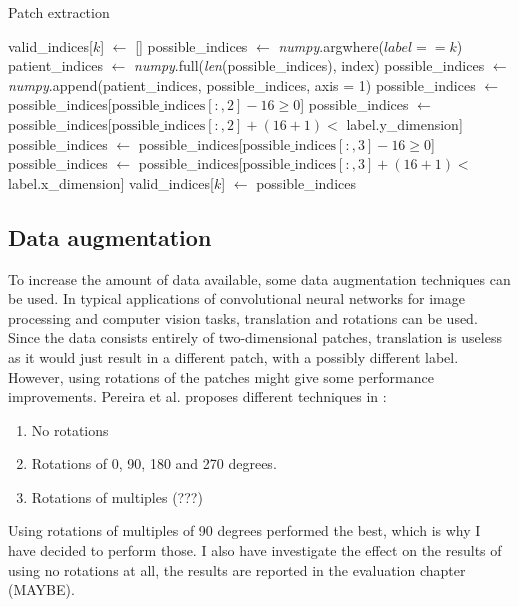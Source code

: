 \documentclass[12pt,a4paper,twoside,openright]{report}
\begin{document}
\begin{algorithm}[h]
\caption{Patch extraction}\label{alg:patch_extraction}
\begin{algorithmic}[1]
	\State valid\_indices[$k$] $\gets$ []
		\State possible\_indices $\gets$ \textit{numpy}.argwhere($label == k$)
		\State patient\_indices $\gets$ \textit{numpy}.full(\textit{len}(possible\_indices), index)
		\State possible\_indices $\gets$ \textit{numpy}.append(patient\_indices, possible\_indices, axis = 1)
		\State
		\State possible\_indices $\gets$ possible\_indices[$\text{possible\_indices}[:,2] - 16 \ge 0$]
		\State possible\_indices $\gets$ possible\_indices[$\text{possible\_indices}[:,2] + (16+1) < $ label.y\_dimension]
		\State possible\_indices $\gets$ possible\_indices[$\text{possible\_indices}[:,3] - 16 \ge 0$]
		\State possible\_indices $\gets$ possible\_indices[$\text{possible\_indices}[:,3] + (16+1) < $ label.x\_dimension]
		\State
		\State valid\_indices[$k$] $\gets$ possible\_indices
	\EndFor
\EndFor
\end{algorithmic}
\end{algorithm}

\subsection{Data augmentation}
To increase the amount of data available, some data augmentation techniques can be used. In typical applications of convolutional neural networks for image processing and computer vision tasks, translation and rotations can be used. Since the data consists entirely of two-dimensional patches, translation is useless as it would just result in a different patch, with a possibly different label. However, using rotations of the patches might give some performance improvements. Pereira et al. proposes different techniques in \cite{pereira}:
\begin{enumerate}
	\item No rotations
	\item Rotations of 0, 90, 180 and 270 degrees.
	\item Rotations of multiples (???)
\end{enumerate}
Using rotations of multiples of 90 degrees performed the best, which is why I have decided to perform those. I also have investigate the effect on the results of using no rotations at all, the results are reported in the evaluation chapter (MAYBE).
\end{document}
